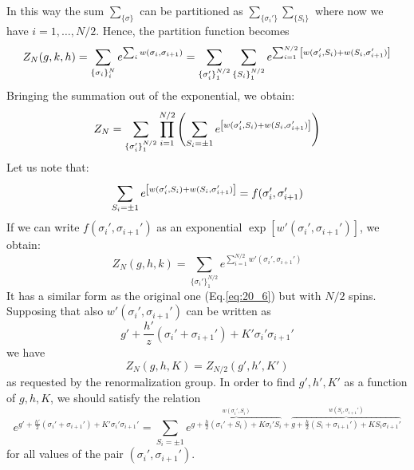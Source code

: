 \documentclass[../main/main.tex]{subfiles}
\begin{document}
In this way the sum \( \sum_{\{ \sigma  \}  }^{}   \) can be partitioned as \( \sum_{\{ \sigma _i' \}  }^{} \sum_{\{ S_i \}  }^{}     \) where now we have \( i=1,\dots,N/2 \). Hence, the partition function becomes
\begin{equation}
  Z_N(g,k,h) = \sum_{\{ \sigma _i \}_i^N  }^{}  e^{\sum_{i}^{}  w (\sigma _i, \sigma _{i+1})}
  = \sum_{\{ \sigma _i' \}_1^{N/2}  }^{} \sum_{\{ S_i \}_1^{N/2}  }^{}
  e^{\sum_{i=1}^{N/2} \qty[w(\sigma _i',S_i) + w(S_i, \sigma _{i+1}')]  }
  \label{eq:20_6}
\end{equation}
Bringing the summation out of the exponential, we obtain:
\begin{equation*}
  Z_N = \sum_{\{ \sigma _i' \}_1^{N/2}} \prod_{i=1}^{N/2}  \qty(  \sum_{  S_i=\pm 1  }^{}  e^{ \qty[ w(\sigma _i',S_i) + w(S_i, \sigma _{i+1}') ]  }  )
\end{equation*}
Let us note that:
\begin{equation*}
   \sum_{  S_i=\pm 1  }^{}  e^{ \qty[ w(\sigma _i',S_i) + w(S_i, \sigma _{i+1}') ]  }
   = f (\sigma _i', \sigma _{i+1}')
\end{equation*}
If we can write \(  f (\sigma _i', \sigma _{i+1}') \) as an exponential
\( \exp [ w' (\sigma _i', \sigma _{i+1}')]  \), we obtain:
\begin{equation}
  Z_N (g,h,k) = \sum_{\{ \sigma _i' \}_1^{N/2}}  e^{\sum_{i=1}^{N/2}  w' (\sigma _i', \sigma _{i+1}') }
\end{equation}
It has a similar form as the original one (Eq.\eqref{eq:20_6}) but with \( N/2 \) spins.
Supposing that also \( w' (\sigma _i', \sigma _{i+1}')  \) can be written as
\begin{equation*}
  g' + \frac{h'}{z} (\sigma _i' + \sigma _{i+1}') + K' \sigma _i' \sigma _{i+1}'
\end{equation*}
we have
\begin{equation}
  Z_N (g,h,K) = Z_{N/2} (g',h',K')
\end{equation}
as requested by the renormalization group.
In order to find \( g',h',K' \) as a function of \( g,h,K \), we should satisfy the relation
\begin{equation}
  e^{ g' + \frac{h'}{2} (\sigma _i' + \sigma _{i+1}') + K' \sigma _i' \sigma _{i+1}' }
  = \sum_{S_i = \pm 1}^{}  e^{ \overbrace{g + \frac{h}{2}(\sigma _i' + S_i) + K \sigma _i' S_i}^{w(\sigma _i',S_i)}  + \overbrace{g + \frac{h}{2} (S_i + \sigma _{i+1}') + K S_i \sigma _{i+1}' }^{w(S_i,\sigma _{i+1}')}  }
\end{equation}
for all values of the pair \( (\sigma _i',\sigma _{i+1}') \).
\end{document}
